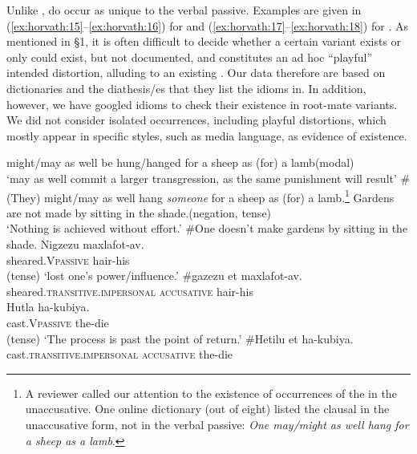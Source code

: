 \documentclass[output=paper,
modfonts
]{LSP/langsci}
\begin{document}
Unlike ,  do occur as unique to the verbal
passive. Examples are given in (\ref{ex:horvath:15}--\ref{ex:horvath:16}) for  and (\ref{ex:horvath:17}--\ref{ex:horvath:18}) for
. As mentioned in \S1, it is often difficult to decide
whether a certain  variant exists or only could exist, but not
documented, and constitutes an ad hoc ``playful'' intended distortion,
alluding to an existing . Our data therefore are based on 
dictionaries and the diathesis/es that they list the idioms in. In
addition, however, we have googled idioms to check their existence in
root-mate variants. We did not consider isolated occurrences, including
playful distortions, which mostly appear in specific styles, such as
media language, as evidence of existence.

\ea \label{ex:horvath:15}\label{ex:sheep}
	\ea \label{ex:horvath:15a} might/may as well be hung/hanged for a sheep as (for) a lamb\hfill (modal)\\
	`may as well commit a larger transgression, as the same punishment will
	result'
	\ex \label{ex:horvath:15b} \#(They) might/may as well hang \emph{someone} for a sheep as (for) a
	lamb.\footnote{A reviewer called our attention to the existence of
  	occurrences of the  in the unaccusative. One online dictionary
  	(out of eight) listed the clausal  in the unaccusative form, not
  	in the verbal passive: \emph{One may/might as well hang for a sheep as
  	a lamb}.}
	\z
\ex \label{ex:horvath:16}
	\ea \label{ex:horvath:16a} Gardens are not made by sitting in the shade.\hfill (negation, tense)\\
	`Nothing is achieved without effort.'
	\ex \label{ex:horvath:16b} \#One doesn't make gardens by sitting in the shade.
	\z
\ex \label{ex:horvath:17}
	\ea \label{ex:horvath:17a} \gll Nigzezu maxlafot-av.\\
	sheared.V\textsc{passive} hair-his\\ \hfill (tense)
	\glt `lost one's power/influence.'
	\ex \label{ex:horvath:17b} \gll \#gazezu et maxlafot-av.\\
	sheared.\textsc{transitive.impersonal} \textsc{accusative} hair-his\\
	\z
\ex \label{ex:horvath:18}\label{ex:hutla}
	\ea \label{ex:horvath:18a} \gll Hutla ha-kubiya. \\
	cast.\textsc{Vpassive} the-die\\ \hfill (tense)
	\glt `The process is past the point of return.' 
	\ex \label{ex:horvath:18b} \gll \#Hetilu et ha-kubiya.\\
	cast.\textsc{transitive.impersonal} \textsc{accusative} the-die\\
	\z
\z
\end{document}
